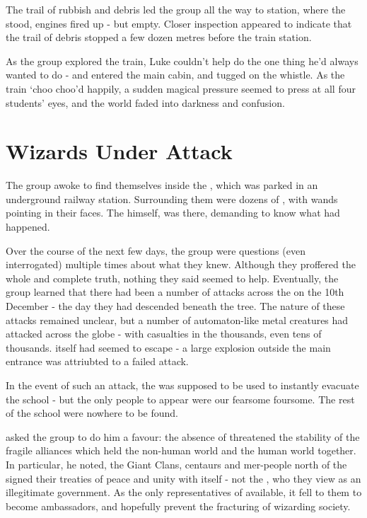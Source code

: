 \documentclass[oneside, 9pt,english]{extbook}
\begin{document}
The trail of rubbish and debris led the group all the way to  station, where the 
stood, engines fired up - but empty. Closer inspection appeared to indicate that the trail of debris stopped
a few dozen metres before the train station.

As the group explored the train, Luke couldn’t help do the one thing he’d always wanted to do - and entered
the main cabin, and tugged on the whistle. As the train ‘choo choo’d happily, a sudden magical pressure seemed to press at all four students’ eyes, and
the world faded into darkness and confusion.

\section{Wizards Under Attack}

The group awoke to find themselves inside the , which was parked in an underground railway station. Surrounding them were dozens of , with wands pointing in their faces. The  himself,  was there, demanding to know what had happened. 

Over the course of the next few days, the group were questions (even interrogated) multiple times about what they knew. Although they proffered the whole and complete truth, nothing they said seemed to help. Eventually, the group learned that there had been a number of attacks across the  on the 10th December - the day they had descended beneath the tree. The nature of these attacks remained unclear, but a number of automaton-like metal creatures had attacked  across the globe - with casualties in the thousands, even tens of thousands.  itself had seemed to escape - a large explosion outside the main entrance was attriubted to a failed attack. 

In the event of such an attack, the  was supposed to be used to instantly evacuate the school - but the only people to appear were our fearsome foursome. The rest of the school were nowhere to be found. 

 asked the group to do him a favour: the absence of  threatened the stability of the fragile alliances which held the non-human world and the human world together. In particular, he noted, the Giant Clans, centaurs and mer-people north of the  signed their treaties of peace and unity with  itself - not the , who they view as an illegitimate government. As the only representatives of  available, it fell to them to become ambassadors, and hopefully prevent the fracturing of wizarding society.
\end{document}
